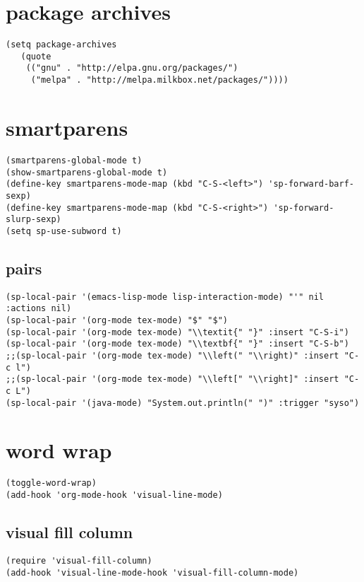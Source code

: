 \documentclass[11pt]{article}
\begin{document}
\section{package archives}
\label{sec:org6c60617}
\begin{verbatim}
(setq package-archives
   (quote
    (("gnu" . "http://elpa.gnu.org/packages/")
     ("melpa" . "http://melpa.milkbox.net/packages/"))))
\end{verbatim}

\section{smartparens}
\label{sec:orga3bb322}


\begin{verbatim}
(smartparens-global-mode t)
(show-smartparens-global-mode t)
(define-key smartparens-mode-map (kbd "C-S-<left>") 'sp-forward-barf-sexp)
(define-key smartparens-mode-map (kbd "C-S-<right>") 'sp-forward-slurp-sexp)
(setq sp-use-subword t)
\end{verbatim}
\subsection{pairs}
\label{sec:org9c8666f}
\begin{verbatim}
(sp-local-pair '(emacs-lisp-mode lisp-interaction-mode) "'" nil :actions nil)
(sp-local-pair '(org-mode tex-mode) "$" "$")
(sp-local-pair '(org-mode tex-mode) "\\textit{" "}" :insert "C-S-i")
(sp-local-pair '(org-mode tex-mode) "\\textbf{" "}" :insert "C-S-b")
;;(sp-local-pair '(org-mode tex-mode) "\\left(" "\\right)" :insert "C-c l")
;;(sp-local-pair '(org-mode tex-mode) "\\left[" "\\right]" :insert "C-c L")
(sp-local-pair '(java-mode) "System.out.println(" ")" :trigger "syso")
\end{verbatim}
\section{word wrap}
\label{sec:org08dfda6}
\begin{verbatim}
(toggle-word-wrap)
(add-hook 'org-mode-hook 'visual-line-mode)
\end{verbatim}
\subsection{visual fill column}
\label{sec:orgb26ab43}
\begin{verbatim}
(require 'visual-fill-column)
(add-hook 'visual-line-mode-hook 'visual-fill-column-mode)
\end{verbatim}
\end{document}

